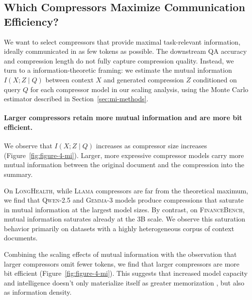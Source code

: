 \documentclass{article} %
\begin{document}
\subsection{Which Compressors Maximize Communication Efficiency?}
\label{sec:mi-be-scaling}

We want to select compressors that provide maximal task-relevant information, ideally communicated in as few tokens as possible. The downstream QA accuracy and compression length do not fully capture compression quality. Instead, we turn to a information-theoretic framing:
we estimate the mutual information \(I(X;Z \mid Q)\) between context $X$ and generated compression $Z$ conditioned on query $Q$ for each compressor model in our scaling analysis, using the Monte Carlo estimator described in Section~\ref{sec:mi-methods}.

\paragraph*{Larger compressors retain more mutual information and are more bit efficient.}
We observe that $I(X;Z \mid Q)$ increases as compressor size increases (Figure~\ref{fig:figure-4-mi}). Larger, more expressive compressor models carry more mutual information between the original document and the compression into the summary.

On \textsc{LongHealth}, while \textsc{Llama} compressors are far from the theoretical maximum, we find that \textsc{Qwen-2.5} and \textsc{Gemma-3} models produce compressions that saturate in mutual information at the largest model sizes. By contrast, on \textsc{FinanceBench}, mutual information saturates already at the 3B scale. We observe this saturation behavior primarily on datasets with a highly heterogeneous corpus of context documents.

Combining the scaling effects of mutual information with the observation that larger compressors omit fewer tokens, we find that larger compressors are more bit efficient (Figure~\ref{fig:figure-4-mi}). This suggests that increased model capacity and intelligence doesn't only materialize itself as greater memorization \citep{morris2025languagemodelsmemorize}, but also as information density.
\end{document}
